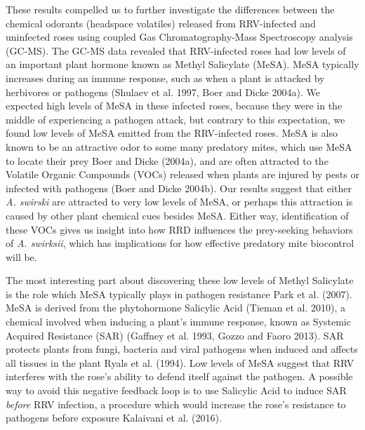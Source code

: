 \documentclass[12pt,final,CPage]{ufthesis}
\begin{document}
{  These results compelled us to further investigate the differences between the chemical odorants (headspace volatiles) released from RRV-infected and uninfected roses using coupled Gas Chromatography-Mass Spectroscopy analysis (GC-MS). The GC-MS data revealed that RRV-infected roses had low levels of an important plant hormone known as Methyl Salicylate (MeSA). MeSA typically increases during an immune response, such as when a plant is attacked by herbivores or pathogens (Shulaev et al. 1997, Boer and Dicke 2004a). We expected high levels of MeSA in these infected roses, because they were in the middle of experiencing a pathogen attack, but contrary to this expectation, we found low levels of MeSA emitted from the RRV-infected roses. MeSA is also known to be an attractive odor to some many predatory mites, which use MeSA to locate their prey Boer and Dicke (2004a), and are often attracted to the Volatile Organic Compounds (VOCs) released when plants are injured by pests or infected with pathogens (Boer and Dicke 2004b). Our results suggest that either \emph{A. swirski} are attracted to very low levels of MeSA, or perhaps this attraction is caused by other plant chemical cues besides MeSA. Either way, identification of these VOCs gives us insight into how RRD influences the prey-seeking behaviors of \emph{A. swirksii}, which has implications for how effective predatory mite biocontrol will be.

  The most interesting part about discovering these low levels of Methyl Salicylate is the role which MeSA typically plays in pathogen resistance Park et al. (2007). MeSA is derived from the phytohormone Salicylic Acid (Tieman et al. 2010), a chemical involved when inducing a plant's immune response, known as Systemic Acquired Resistance (SAR) (Gaffney et al. 1993, Gozzo and Faoro 2013). SAR protects plants from fungi, bacteria and viral pathogens when induced and affects all tissues in the plant Ryals et al. (1994). Low levels of MeSA suggest that RRV interferes with the rose's ability to defend itself against the pathogen. A possible way to avoid this negative feedback loop is to use Salicylic Acid to induce SAR \emph{before} RRV infection, a procedure which would increase the rose's resistance to pathogens before exposure Kalaivani et al. (2016).

}
\end{document}
